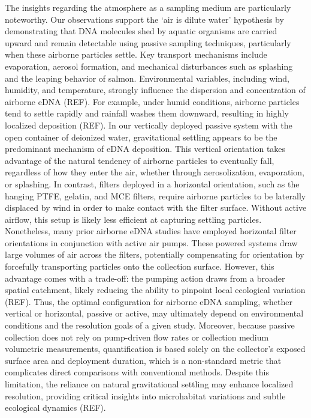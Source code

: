 \documentclass{article}
\begin{document}
The insights regarding the atmosphere as a sampling medium are particularly noteworthy. Our observations support the ‘air is dilute water’ hypothesis by demonstrating that DNA molecules shed by aquatic organisms are carried upward and remain detectable using passive sampling techniques, particularly when these airborne particles settle. Key transport mechanisms include evaporation, aerosol formation, and mechanical disturbances such as splashing and the leaping behavior of salmon. Environmental variables, including wind, humidity, and temperature, strongly influence the dispersion and concentration of airborne eDNA (REF). For example, under humid conditions, airborne particles tend to settle rapidly and rainfall washes them downward, resulting in highly localized deposition (REF). In our vertically deployed passive system with the open container of deionized water, gravitational settling appears to be the predominant mechanism of eDNA deposition. This vertical orientation takes advantage of the natural tendency of airborne particles to eventually fall, regardless of how they enter the air, whether through aerosolization, evaporation, or splashing. In contrast, filters deployed in a horizontal orientation, such as the hanging PTFE, gelatin, and MCE filters, require airborne particles to be laterally displaced by wind in order to make contact with the filter surface. Without active airflow, this setup is likely less efficient at capturing settling particles. Nonetheless, many prior airborne eDNA studies have employed horizontal filter orientations in conjunction with active air pumps. These powered systems draw large volumes of air across the filters, potentially compensating for orientation by forcefully transporting particles onto the collection surface. However, this advantage comes with a trade-off: the pumping action draws from a broader spatial catchment, likely reducing the ability to pinpoint local ecological variation (REF). Thus, the optimal configuration for airborne eDNA sampling, whether vertical or horizontal, passive or active, may ultimately depend on environmental conditions and the resolution goals of a given study. Moreover, because passive collection does not rely on pump-driven flow rates or collection medium volumetric measurements, quantification is based solely on the collector’s exposed surface area and deployment duration, which is a non-standard metric that complicates direct comparisons with conventional methods. Despite this limitation, the reliance on natural gravitational settling may enhance localized resolution, providing critical insights into microhabitat variations and subtle ecological dynamics (REF).
\end{document}
